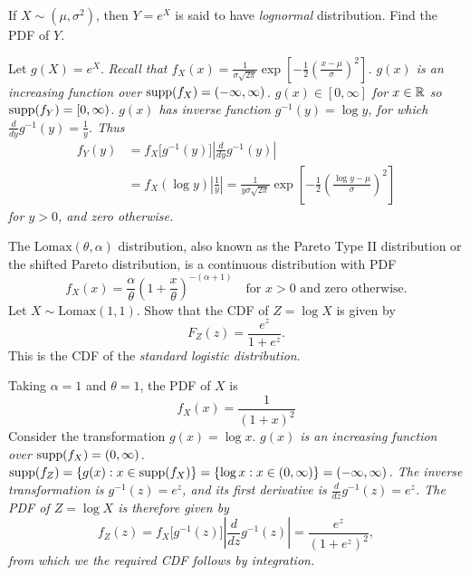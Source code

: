 \begin{example}
If $X\sim(\mu,\sigma^2)$, then $Y=e^X$ is said to have \emph{lognormal} distribution. Find the PDF of $Y$.
\end{example}
\begin{solution}
Let $g(X) = e^X$. 
\bit
\it Recall that $f_X(x) = \displaystyle\frac{1}{\sigma\sqrt{2\pi}}\exp\left[-\frac{1}{2}\left(\frac{x-\mu}{\sigma}\right)^2\right]$.
\it $g(x)$ is an increasing function over $\text{supp}(f_X) = (-\infty,\infty)$.
\it $g(x)\in[0,\infty]$ for $x\in\mathbb{R}$ so $\text{supp}(f_Y) = [0,\infty)$.
\it $g(x)$ has inverse function $g^{-1}(y) = \log y$, for which $\displaystyle \frac{d}{dy}g^{-1}(y) = \frac{1}{y}$.
\eit
Thus
\begin{align*}
f_Y(y)
	& = f_X\big[g^{-1}(y)\big]\left|\frac{d}{dy}g^{-1}(y)\right| \\
	& = f_X(\log y)\left|\frac{1}{y}\right| 
	=  \frac{1}{y\sigma\sqrt{2\pi}}\exp\left[-\frac{1}{2}\left(\frac{\log y-\mu}{\sigma}\right)^2\right]
\end{align*}
for $y>0$, and zero otherwise.
\end{solution}




\begin{example}
The $\text{Lomax}(\theta,\alpha)$ distribution, also known as the Pareto Type II distribution or the shifted Pareto distribution, is a continuous distribution with PDF
\[
f_X(x) = \frac{\alpha}{\theta}\left(1+\frac{x}{\theta}\right)^{-(\alpha+1)}	\quad\text{for $x > 0$ and zero otherwise.}
\]
Let $X\sim\text{Lomax}(1,1)$. Show that the CDF of $Z = \log X$ is given by
\[
F_Z(z) =  \frac{e^z}{1+e^z}.
\]
This is the CDF of the \emph{standard logistic distribution}.
\end{example}
\begin{solution}
Taking $\alpha=1$ and $\theta=1$, the PDF of $X$ is 
\[
f_X(x) = \frac{1}{(1 + x)^2}
\]
Consider the transformation $g(x) = \log x$.
\bit
\it $g(x)$ is an increasing function over $\text{supp}(f_X)=(0,\infty)$.
\it $\text{supp}(f_Z) = \{g(x):x\in\text{supp}(f_X)\} = \{\log x: x\in(0,\infty)\} = (-\infty,\infty)$.
\it The inverse transformation is  $g^{-1}(z) = e^z$, and its first derivative is $\displaystyle\frac{d}{dz}g^{-1}(z) = e^z$.
\eit
The PDF of $Z = \log X$ is therefore given by
\[
f_Z(z) = f_X\big[g^{-1}(z)\big]\left|\frac{d}{dz}g^{-1}(z)\right| = \frac{e^z}{(1+e^z)^2},
\]
from which we the required CDF follows by integration.
\end{solution}

